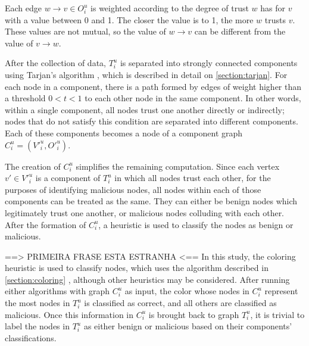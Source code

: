 \documentclass[conference]{IEEEtran}
\begin{document}
Each edge $w \rightarrow v \in O^u_i$ is weighted according to the degree of trust $w$ has for $v$ with a value between 0 and 1.
The closer the value is to 1, the more $w$ trusts $v$.
These values are not mutual, so the value of $w \rightarrow v$ can be different from the value of $v \rightarrow w$.

After the collection of data, $T^u_i$ is separated into strongly connected components using Tarjan's algorithm \cite{tarjan1972depth}, which is described in detail on \autoref{section:tarjan}.
For each node in a component, there is a path formed by edges of weight higher than a threshold $0 < t < 1$ to each other node in the same component.
In other words, within a single component, all nodes trust one another directly or indirectly; nodes that do not satisfy this condition are separated into different components.
Each of these components becomes a node of a component graph $C^u_i = (V'^u_i, O'^u_i)$.

The creation of $C^u_i$ simplifies the remaining computation.
Since each vertex $v' \in V'^u_i$ is a component of $T^u_i$ in which all nodes trust each other, for the purposes of identifying malicious nodes, all nodes within each of those components can be treated as the same.
They can either be benign nodes which legitimately trust one another, or malicious nodes colluding with each other.
After the formation of $C^u_i$, a heuristic is used to classify the nodes as benign or malicious.


==> PRIMEIRA FRASE ESTA ESTRANHA <==
In this study, the coloring heuristic is used to classify nodes, which uses the algorithm described in \autoref{section:coloring} \cite{mittal2011graph}, although other heuristics may be considered.
After running either algorithms with graph $C^u_i$ as input, the color whose nodes in $C^u_i$ represent the most nodes in $T^u_i$ is classified as correct, and all others are classified as malicious.
Once this information in $C^u_i$ is brought back to graph $T^u_i$, it is trivial to label the nodes in $T^u_i$ as either benign or malicious based on their components' classifications.

\end{document}
